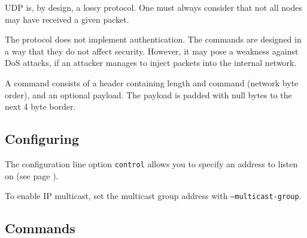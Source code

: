 \documentclass[a4paper,12pt]{article}
\begin{document}
UDP is, by design, a lossy protocol.  One must always consider that
not all nodes may have received a given packet.

The protocol does not implement authentication.  The commands are
designed in a way that they do not affect security.  However, it may
pose a weakness against DoS attacks, if an attacker manages to inject
packets into the internal network.

A command consists of a header containing length and command (network
byte order), and an optional payload.  The payload is padded with null
bytes to the next 4 byte border.

\subsection{Configuring}

The configuration line option \verb|control| allows you to specify an
address to listen on (see page \pageref{config.control}).

To enable IP multicast, set the multicast group address with
\texttt{--multicast-group}.

\subsection{Commands}
\end{document}
